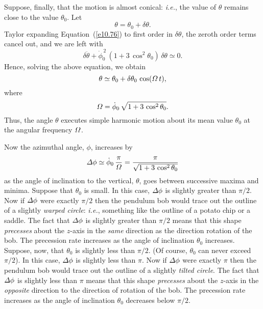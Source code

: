 Suppose, finally, that the motion is almost conical: {\em i.e.}, the value
of $\theta$ remains close to the value $\theta_0$. Let
\begin{equation}
\theta = \theta_0 + \delta\theta.
\end{equation}
Taylor expanding Equation~(\ref{e10.76}) to first order in $\delta\theta$, the zeroth
order terms cancel out, and we are left with
\begin{equation}
\delta\ddot{\theta} + \dot{\phi}_0^{\,2}\,(1+ 3\,\cos^2\theta_0)\,\delta\theta \simeq 0.
\end{equation}
Hence, solving the above equation, we obtain
\begin{equation}
\theta \simeq \theta_0 + \delta\theta_0\,\cos({\mit\Omega}\,t),
\end{equation}
where
\begin{equation}
{\mit\Omega} = \dot{\phi}_0 \,\sqrt{1+ 3\,\cos^2\theta_0}.
\end{equation}
Thus, the angle $\theta$ executes simple harmonic motion about its
mean value $\theta_0$ at the angular frequency ${\mit\Omega}$. 

Now the azimuthal angle, $\phi$, increases by
\begin{equation}
{\mit\Delta}\phi \simeq \dot{\phi}_0\,\frac{\pi}{{\mit\Omega}}= \frac{\pi}{\sqrt{1+3\,\cos^2\theta_0}}
\end{equation}
as the angle of inclination to the vertical, $\theta$, goes between
successive maxima and minima. Suppose that $\theta_0$ is small.
In this case, ${\mit\Delta}\phi$ is slightly greater than $\pi/2$. Now
if ${\mit\Delta}\phi$ were exactly $\pi/2$ then the pendulum bob would
trace out the outline of a slightly {\em warped circle}: {\em i.e.}, something like the
outline of a potato chip or a saddle. The fact that ${\mit\Delta}\phi$
is slightly greater than $\pi/2$ means that this shape {\em precesses}\/ about
the $z$-axis in the {\em same}\/ direction as the direction rotation of the bob. The precession rate increases as 
the angle of inclination $\theta_0$ increases. Suppose, now, that $\theta_0$
is slightly less than $\pi/2$. (Of course, $\theta_0$ can never exceed $\pi/2$).
In this case, ${\mit\Delta}\phi$ is slightly less than $\pi$. Now
if ${\mit\Delta}\phi$ were exactly $\pi$ then the pendulum bob would
trace out the outline of a slightly {\em tilted circle}. The fact that
${\mit\Delta}\phi$ is slightly less than $\pi$ means that this shape
{\em precesses}\/ about the $z$-axis in the {\em opposite}\/ direction to the
direction of rotation of the bob. The precession rate increases as the
angle of inclination $\theta_0$ decreases below $\pi/2$. 

